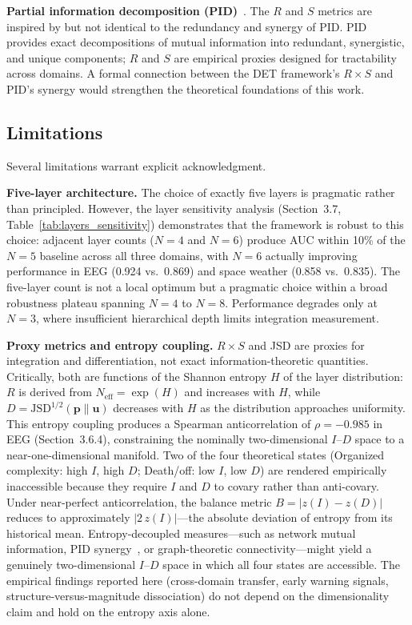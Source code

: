 \documentclass[aip,cha,reprint,amsmath,amssymb,final,floatfix]{revtex4-2}
\begin{document}
\textbf{Partial information decomposition (PID)}~\cite{williams2010,aguilera2019,popiel2020}. The $R$ and $S$ metrics are inspired by but not identical to the redundancy and synergy of PID. PID provides exact decompositions of mutual information into redundant, synergistic, and unique components; $R$ and $S$ are empirical proxies designed for tractability across domains. A formal connection between the DET framework's $R \times S$ and PID's synergy would strengthen the theoretical foundations of this work.

\subsection{Limitations}

Several limitations warrant explicit acknowledgment.

\textbf{Five-layer architecture.} The choice of exactly five layers is pragmatic rather than principled. However, the layer sensitivity analysis (Section~3.7, Table~\ref{tab:layers_sensitivity}) demonstrates that the framework is robust to this choice: adjacent layer counts ($N = 4$ and $N = 6$) produce AUC within 10\% of the $N = 5$ baseline across all three domains, with $N = 6$ actually improving performance in EEG (0.924 vs.\ 0.869) and space weather (0.858 vs.\ 0.835). The five-layer count is not a local optimum but a pragmatic choice within a broad robustness plateau spanning $N = 4$ to $N = 8$. Performance degrades only at $N = 3$, where insufficient hierarchical depth limits integration measurement.

\textbf{Proxy metrics and entropy coupling.} $R \times S$ and JSD are proxies for integration and differentiation, not exact information-theoretic quantities. Critically, both are functions of the Shannon entropy $H$ of the layer distribution: $R$ is derived from $N_{\text{eff}} = \exp(H)$ and increases with $H$, while $D = \text{JSD}^{1/2}(\mathbf{p} \| \mathbf{u})$ decreases with $H$ as the distribution approaches uniformity. This entropy coupling produces a Spearman anticorrelation of $\rho = -0.985$ in EEG (Section~3.6.4), constraining the nominally two-dimensional $I$--$D$ space to a near-one-dimensional manifold. Two of the four theoretical states (Organized complexity: high $I$, high $D$; Death/off: low $I$, low $D$) are rendered empirically inaccessible because they require $I$ and $D$ to covary rather than anti-covary. Under near-perfect anticorrelation, the balance metric $B = |z(I) - z(D)|$ reduces to approximately $|2\,z(I)|$---the absolute deviation of entropy from its historical mean. Entropy-decoupled measures---such as network mutual information, PID synergy~\cite{williams2010}, or graph-theoretic connectivity---might yield a genuinely two-dimensional $I$--$D$ space in which all four states are accessible. The empirical findings reported here (cross-domain transfer, early warning signals, structure-versus-magnitude dissociation) do not depend on the dimensionality claim and hold on the entropy axis alone.
\end{document}
